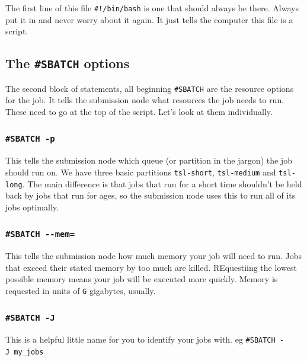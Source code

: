 \documentclass[]{book}
\begin{document}
The first line of this file \texttt{\#!/bin/bash} is one that should always be there. Always put it in and never worry about it again. It just tells the computer this file is a script.

\hypertarget{the-sbatch-options}{%
\subsection{\texorpdfstring{The \texttt{\#SBATCH} options}{The \#SBATCH options}}\label{the-sbatch-options}}

The second block of statements, all beginning \texttt{\#SBATCH} are the resource options for the job. It tells the submission node what resources the job needs to run. These need to go at the top of the script. Let's look at them individually.

\hypertarget{sbatch--p}{%
\subsubsection{\texorpdfstring{\texttt{\#SBATCH\ -p}}{\#SBATCH -p}}\label{sbatch--p}}

This tells the submission node which queue (or partition in the jargon) the job should run on. We have three basic partitions \texttt{tsl-short}, \texttt{tsl-medium} and \texttt{tsl-long}. The main difference is that jobs that run for a short time shouldn't be held back by jobs that run for ages, so the submission node uses this to run all of its jobs optimally.

\hypertarget{sbatch---mem}{%
\subsubsection{\texorpdfstring{\texttt{\#SBATCH\ -\/-mem=}}{\#SBATCH -\/-mem=}}\label{sbatch---mem}}

This tells the submission node how much memory your job will need to run. Jobs that exceed their stated memory by too much are killed. REquestiing the lowest possible memory means your job will be executed more quickly. Memory is requested in units of \texttt{G} gigabytes, usually.

\hypertarget{sbatch--j}{%
\subsubsection{\texorpdfstring{\texttt{\#SBATCH\ -J}}{\#SBATCH -J}}\label{sbatch--j}}

This is a helpful little name for you to identify your jobs with. eg \texttt{\#SBATCH\ -J\ my\_jobs}
\end{document}
